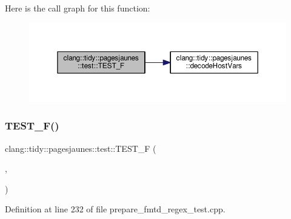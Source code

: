 Here is the call graph for this function\+:
\nopagebreak
\begin{figure}[H]
\begin{center}
\leavevmode
\includegraphics[width=350pt]{namespaceclang_1_1tidy_1_1pagesjaunes_1_1test_a54aa96058cd21d48458c5b07b5d256f6_cgraph}
\end{center}
\end{figure}
\mbox{\label{namespaceclang_1_1tidy_1_1pagesjaunes_1_1test_a3fb5315c6f6fff42c5c1b4023c647b1d}} 
\subsubsection{\texorpdfstring{T\+E\+S\+T\+\_\+\+F()}{TEST\_F()}\hspace{0.1cm}{\footnotesize\ttfamily [50/57]}}
{\footnotesize\ttfamily clang\+::tidy\+::pagesjaunes\+::test\+::\+T\+E\+S\+T\+\_\+F (\begin{DoxyParamCaption}\item[{\hyperlink{classclang_1_1tidy_1_1pagesjaunes_1_1test_1_1_prepare_fmtd_regex_test}{Prepare\+Fmtd\+Regex\+Test}}]{,  }\item[{Regex\+Matching\+Bad\+Colon\+Syntax}]{ }\end{DoxyParamCaption})}



Definition at line 232 of file prepare\+\_\+fmtd\+\_\+regex\+\_\+test.\+cpp.

